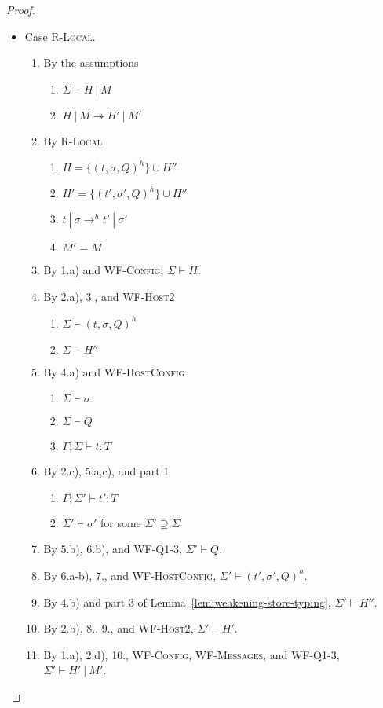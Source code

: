 \begin{proof}
\begin{itemize}
\item Case \textsc{R-Local}.
\begin{enumerate}
\item By the assumptions
  \begin{enumerate}[label=(\alph*)]
  \item $\Sigma \vdash H~|~M$
  \item $H~|~M \twoheadrightarrow H'~|~M'$
  \end{enumerate}
\item By \textsc{R-Local}
  \begin{enumerate}[label=(\alph*)]
  \item $H = \{ (t, \sigma, Q)^h \} \cup H''$
  \item $H' = \{ (t', \sigma', Q)^h \} \cup H''$
  \item $t~|~\sigma \rightarrow^h t'~|~\sigma'$
  \item $M' = M$
  \end{enumerate}
\item By 1.a) and \textsc{WF-Config}, $\Sigma \vdash H$.
\item By 2.a), 3., and \textsc{WF-Host2}
  \begin{enumerate}[label=(\alph*)]
  \item $\Sigma \vdash (t, \sigma, Q)^h$
  \item $\Sigma \vdash H''$
  \end{enumerate}
\item By 4.a) and \textsc{WF-HostConfig}
  \begin{enumerate}[label=(\alph*)]
  \item $\Sigma \vdash \sigma$
  \item $\Sigma \vdash Q$
  \item $\Gamma ; \Sigma \vdash t : T$
  \end{enumerate}
\item By 2.c), 5.a,c), and part 1
  \begin{enumerate}[label=(\alph*)]
  \item $\Gamma ; \Sigma' \vdash t' : T$
  \item $\Sigma' \vdash \sigma'$ for some $\Sigma' \supseteq \Sigma$
  \end{enumerate}
\item By 5.b), 6.b), and \textsc{WF-Q1-3}, $\Sigma' \vdash Q$.
\item By 6.a-b), 7., and \textsc{WF-HostConfig}, $\Sigma' \vdash (t', \sigma', Q)^h$.
\item By 4.b) and part 3 of Lemma~\ref{lem:weakening-store-typing}, $\Sigma' \vdash H''$.
\item By 2.b), 8., 9., and \textsc{WF-Host2}, $\Sigma' \vdash H'$.
\item By 1.a), 2.d), 10., \textsc{WF-Config}, \textsc{WF-Messages}, and \textsc{WF-Q1-3}, $\Sigma' \vdash H'~|~M'$.
\end{enumerate}


\end{itemize}
\end{proof}
